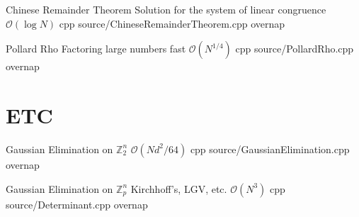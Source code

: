 \documentclass[landscape, 10pt, a4paper, oneside, twocolumn]{extarticle}
\begin{document}
\Algorithm
{Chinese Remainder Theorem}
{Solution for the system of linear congruence}
{$\mathcal{O}(\log{N})$}
{cpp}
{source/ChineseRemainderTheorem.cpp}
{overnap}

\Algorithm
{Pollard Rho}
{Factoring large numbers fast}
{$\mathcal{O}(N^{1/4})$}
{cpp}
{source/PollardRho.cpp}
{overnap}


\section{ETC}

\Algorithm
{Gaussian Elimination on $\mathbb{Z}^n_2$}
{}
{$\mathcal{O}(Nd^2/64)$}
{cpp}
{source/GaussianElimination.cpp}
{overnap}

\Algorithm
{Gaussian Elimination on $\mathbb{Z}^n_p$}
{Kirchhoff's, LGV, etc.}
{$\mathcal{O}(N^3)$}
{cpp}
{source/Determinant.cpp}
{overnap}





\end{document}
